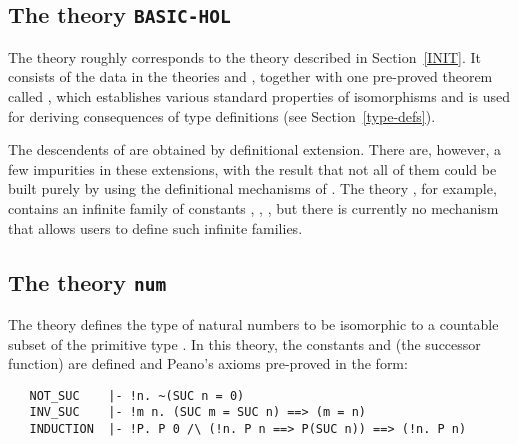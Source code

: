 {{\subsection{The theory {\tt BASIC-HOL}}

The theory  roughly corresponds to the theory
 described in Section~\ref{INIT}. It consists of the data
in the theories  and , together with one pre-proved theorem
called , which establishes various standard properties
of isomorphisms and is used for deriving consequences of type definitions (see 
Section~\ref{type-defs}).

The descendents of  are obtained by definitional extension.
There are, however, a few impurities in these extensions, with the result that
not all of them could be built purely by using the definitional mechanisms of
\HOL. The theory , for example, contains an infinite family of
constants , ,  \etc, but there is currently no 
mechanism that allows users to define such infinite families.

\subsection{The theory {\tt num}}

The theory 
defines the type  of natural numbers to be
isomorphic to a countable subset of the primitive type .  In this
theory, the constants 
 and  (the successor function) are defined
and Peano's axioms pre-proved in the form:


\begin{hol}
\begin{verbatim}
   NOT_SUC    |- !n. ~(SUC n = 0)
   INV_SUC    |- !m n. (SUC m = SUC n) ==> (m = n)
   INDUCTION  |- !P. P 0 /\ (!n. P n ==> P(SUC n)) ==> (!n. P n)
\end{verbatim}\end{hol}

}}
